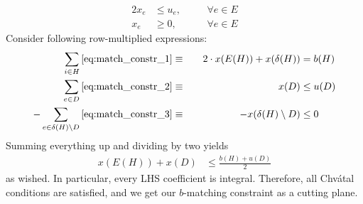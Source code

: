 \begin{aufgabe}
\begin{enumerate}[label=(\alph*)]
\begin{alignat}{2}
                  x_e          & \leq u_e, &  & \quad \forall e \in E\label{eq:match_constr_2} \\
                  x_e          & \geq 0,   &  & \quad \forall e \in E\label{eq:match_constr_3}
              \end{alignat}
              Consider following row-multiplied expressions:
              \begin{alignat*}{2}
                  \sum_{i \in H} \eqref{eq:match_constr_1}                      & \equiv \quad & 2 \cdot x(E(H)) + x(\delta(H)) & = b(H)    \\
                  \sum_{e \in D} \eqref{eq:match_constr_2}                      & \equiv \quad & x(D)                           & \leq u(D) \\
                  -\sum_{e \in \delta(H) \setminus D} \eqref{eq:match_constr_3} & \equiv \quad & -x(\delta(H) \setminus D)      & \leq 0
              \end{alignat*}
              Summing everything up and dividing by two yields
              \begin{align*}
                  x(E(H)) + x(D) & \leq \frac{b(H) + u(D)}{2}
              \end{align*}
              as wished. In particular, every LHS coefficient is integral.
              Therefore, all Chv\'atal conditions are satisfied, and we get our $b$-matching constraint as a cutting plane.
    \end{enumerate}
\end{aufgabe}
